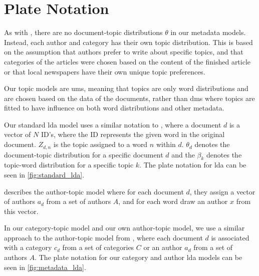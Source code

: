 \section{Plate Notation}
As with \citet{author_topic_2012}, there are no document-topic distributions $\theta$ in our metadata models.
Instead, each author and category has their own topic distribution.
This is based on the assumption that authors prefer to write about specific topics, and that categories of the articles were chosen based on the content of the finished article or that local newspapers have their own unique topic preferences.

Our topic models are \glspl{um}, meaning that topics are only word distributions and are chosen based on the data of the documents, rather than \glspl{dm} where topics are fitted to have influence on both word distributions and other metadata.

Our standard \gls{lda} model uses a similar notation to \citet{blei2003latent}, where a document $d$ is a vector of $N$ ID's, where the ID represents the given word in the original document. $Z_{d,n}$ is the topic assigned to a word $n$ within $d$.
$\theta_d$ denotes the document-topic distribution for a specific document $d$ and the $\beta_k$ denotes the topic-word distribution for a specific topic $k$.
The plate notation for \gls{lda} can be seen in \autoref{fig:standard_lda}.

\citet{author_topic_2012} describes the author-topic model where for each document $d$, they assign a vector of authors $a_d$ from a set of authors $A$, and for each word draw an author $x$ from this vector.

In our category-topic model and our own author-topic model, we use a similar approach to the author-topic model from \citeauthor{author_topic_2012}, where each document $d$ is associated with a category $c_d$ from a set of categories $C$ or an author $a_d$ from a set of authors $A$.
The plate notation for our category and author \gls{lda} models can be seen in \autoref{fig:metadata_lda}.


